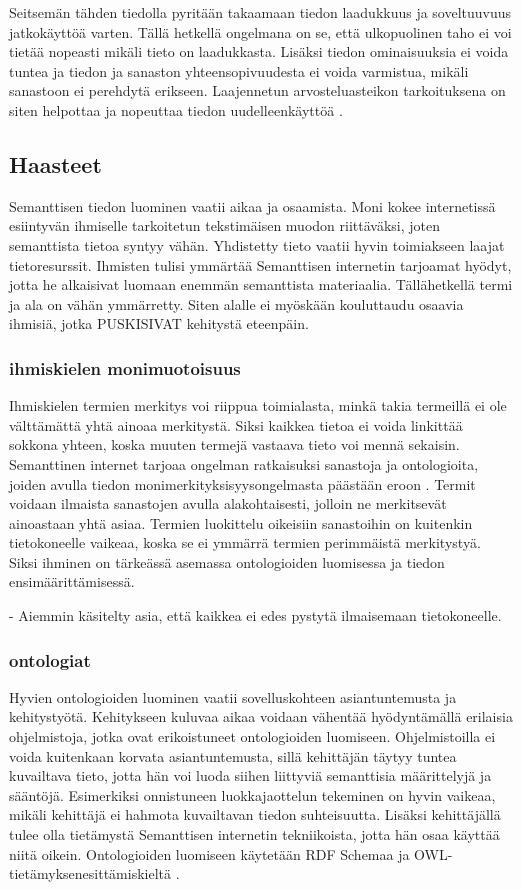 \documentclass[finnish, 12pt, a4paper, elec, utf8, pdfa, online]{aaltothesis}
\begin{document}
{Seitsemän tähden tiedolla pyritään takaamaan tiedon laadukkuus ja soveltuuvuus jatkokäyttöä varten. Tällä hetkellä ongelmana on se, että ulkopuolinen taho ei voi tietää nopeasti mikäli tieto on laadukkasta. Lisäksi tiedon ominaisuuksia ei voida tuntea ja tiedon ja sanaston yhteensopivuudesta ei voida varmistua, mikäli sanastoon ei perehdytä erikseen. Laajennetun arvosteluasteikon tarkoituksena on siten helpottaa ja nopeuttaa tiedon uudelleenkäyttöä \cite{SeCo_stars}.


\subsection{Haasteet}


Semanttisen tiedon luominen vaatii aikaa ja osaamista. Moni kokee internetissä esiintyvän ihmiselle tarkoitetun tekstimäisen muodon riittäväksi, joten semanttista tietoa syntyy vähän. Yhdistetty tieto vaatii hyvin toimiakseen laajat tietoresurssit. Ihmisten tulisi ymmärtää Semanttisen internetin tarjoamat hyödyt, jotta he alkaisivat luomaan enemmän semanttista materiaalia. Tällähetkellä termi ja ala on vähän ymmärretty. Siten alalle ei myöskään kouluttaudu osaavia ihmisiä, jotka PUSKISIVAT kehitystä eteenpäin.



\subsubsection{ihmiskielen monimuotoisuus}
Ihmiskielen termien merkitys voi riippua toimialasta, minkä takia termeillä ei ole välttämättä yhtä ainoaa merkitystä. Siksi kaikkea tietoa ei voida linkittää sokkona yhteen, koska muuten termejä vastaava tieto voi mennä sekaisin. Semanttinen internet tarjoaa ongelman ratkaisuksi sanastoja ja ontologioita, joiden avulla tiedon monimerkityksisyysongelmasta päästään eroon \cite{linked_data_finlad}. Termit voidaan ilmaista sanastojen avulla alakohtaisesti, jolloin ne merkitsevät ainoastaan yhtä asiaa. Termien luokittelu oikeisiin sanastoihin on kuitenkin tietokoneelle vaikeaa, koska se ei ymmärrä termien perimmäistä merkitystyä. Siksi ihminen on tärkeässä asemassa ontologioiden luomisessa ja tiedon ensimäärittämisessä.

- Aiemmin käsitelty asia, että kaikkea ei edes pystytä ilmaisemaan tietokoneelle.


\subsubsection{ontologiat}
Hyvien ontologioiden luominen vaatii sovelluskohteen asiantuntemusta ja kehitystyötä.
Kehitykseen kuluvaa aikaa voidaan vähentää hyödyntämällä erilaisia ohjelmistoja, jotka ovat erikoistuneet ontologioiden luomiseen. Ohjelmistoilla ei voida kuitenkaan korvata asiantuntemusta, sillä kehittäjän täytyy tuntea kuvailtava tieto, jotta hän voi luoda siihen liittyviä semanttisia määrittelyjä ja sääntöjä. Esimerkiksi onnistuneen luokkajaottelun tekeminen on hyvin vaikeaa, mikäli kehittäjä ei hahmota kuvailtavan tiedon suhteisuutta. Lisäksi kehittäjällä tulee olla tietämystä Semanttisen internetin tekniikoista, jotta hän osaa käyttää niitä oikein. Ontologioiden luomiseen käytetään RDF Schemaa ja OWL-tietämyksenesittämiskieltä \cite{OWL_specification}.
}
\end{document}
